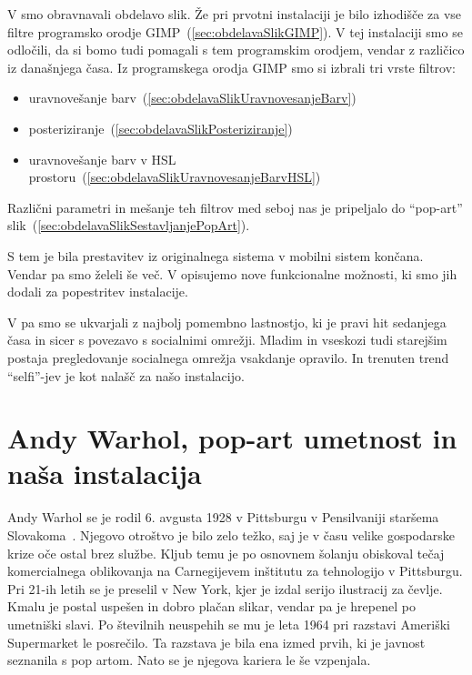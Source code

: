 V  smo obravnavali obdelavo slik. Že pri prvotni
instalaciji je bilo izhodišče za vse filtre programsko orodje
GIMP~(\ref{sec:obdelavaSlikGIMP}). V tej instalaciji smo se odločili, da si
bomo tudi pomagali s tem programskim orodjem, vendar z različico iz današnjega
časa. Iz programskega orodja GIMP smo si izbrali tri vrste filtrov:
\begin{itemize}
    \item uravnovešanje barv~(\ref{sec:obdelavaSlikUravnovesanjeBarv})
    \item posteriziranje~(\ref{sec:obdelavaSlikPosteriziranje})
    \item uravnovešanje barv v HSL prostoru~(\ref{sec:obdelavaSlikUravnovesanjeBarvHSL})
\end{itemize}
Različni parametri in mešanje teh filtrov med seboj nas je pripeljalo do
``pop-art'' slik~(\ref{sec:obdelavaSlikSestavljanjePopArt}).

S tem je bila prestavitev iz originalnega sistema v mobilni sistem končana.
Vendar pa smo želeli še več. V  opisujemo nove
funkcionalne možnosti, ki smo jih dodali za popestritev instalacije.

V  pa smo se ukvarjali z najbolj pomembno
lastnostjo, ki je pravi hit sedanjega časa in sicer s povezavo s socialnimi
omrežji. Mladim in vseskozi tudi starejšim postaja pregledovanje socialnega
omrežja vsakdanje opravilo. In trenuten trend ``selfi''-jev je kot nalašč za
našo instalacijo.


\chapter{Andy Warhol, pop-art umetnost in naša instalacija}
\label{ch:AndyWarhol_popart}
Andy Warhol se je rodil 6. avgusta 1928 v Pittsburgu v Pensilvaniji staršema
Slovakoma~\cite{wiki:AndyWarhol}. Njegovo otroštvo je bilo zelo težko, saj je
v času velike gospodarske krize oče ostal brez službe. Kljub temu je po
osnovnem šolanju obiskoval tečaj komercialnega oblikovanja na Carnegijevem
inštitutu za tehnologijo v Pittsburgu. Pri 21-ih letih se je preselil v New
York, kjer je izdal serijo ilustracij za čevlje. Kmalu je postal uspešen in
dobro plačan slikar, vendar pa je hrepenel po umetniški slavi. Po številnih
neuspehih se mu je leta 1964 pri razstavi Ameriški Supermarket le posrečilo.
Ta razstava je bila ena izmed prvih, ki je javnost seznanila s pop artom. Nato
se je njegova kariera le še vzpenjala.

